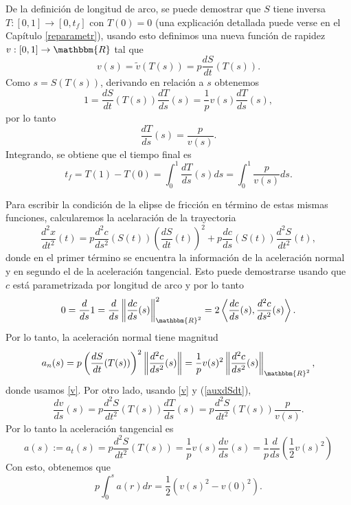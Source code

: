 \documentclass[a4paper,10pt]{book}
\newcommand{\R}{\mathbbm{R}}
\newcommand{\arr}{\rightarrow}
\begin{document}
De la definici\'on de longitud de arco, se puede demostrar que $S$ tiene inversa $T:[0,1]\arr [0,t_f]$ con $T(0)=0$ (una explicación detallada puede verse en el Capítulo \ref{reparametr}), usando esto
definimos una nueva funci\'on de rapidez $v:[0,1]\arr\R$ tal que
\begin{equation}\label{v}
v(s)=\tilde v(T(s))=p\frac{dS}{dt}(T(s)). 
\end{equation}
Como $s=S(T(s))$, derivando en relaci\'on a $s$ obtenemos 
\begin{equation}\label{auxdSdt}
1=\frac{dS}{dt}(T(s)) \frac{dT}{ds}(s)= \frac{1}{p} v(s)\frac{dT}{ds}(s), 
\end{equation}
por lo tanto
\[
 \frac{dT}{ds}(s)=\frac{p}{v(s)}.
\]
Integrando, se obtiene que el tiempo final es
\begin{equation}\label{tiempo}
t_f=T(1)-T(0)=\int_{0}^{1} \frac{dT}{ds}(s) ds= \int_{0}^{1} \frac{p}{v(s)}ds.    
\end{equation}


Para escribir la condici\'on de la elipse de fricción en t\'ermino de estas mismas funciones, calcularemos la acelaración de la trayectoria
\begin{equation}\label{aceleracion}
\frac{d^2 x}{dt^2}(t)= p\frac{d^2 c}{ds^2}(S(t)) \left(\frac{dS}{dt}(t)\right)^2 + p\frac{dc}{ds}(S(t))\frac{d^2 S}{dt^2}(t),
\end{equation}
donde en el primer t\'ermino se encuentra la informaci\'on de la aceleraci\'on normal y en segundo el de la aceleraci\'on tangencial. Esto puede demostrarse usando que $c$ est\'a parametrizada por longitud de arco y por lo tanto
\[
 0=\frac{d}{ds}1=\frac{d}{ds}\left\| \frac{dc}{ds}(s)\right\|_{\R^2}^2=2 \left\langle\frac{dc}{ds}(s) , \frac{d^2 c}{ds^2}(s)\right\rangle. 
\]
Por lo tanto, la aceleración normal tiene magnitud
\begin{equation}\label{acelnormal}
a_n(s)=p\left(\frac{dS}{dt}(T(s))\right)^2\left\| \frac{d^2 c}{ds^2}(s) \right\|=\frac{1}{p} v(s)^2\left\| \frac{d^2 c}{ds^2}(s) \right\|_{\R^2},
\end{equation}
donde usamos \eqref{v}. Por otro lado, usando \eqref{v} y (\ref{auxdSdt}),
\[
 \frac{dv}{ds}(s)=p\frac{d^2 S}{dt^2}(T(s))\frac{dT}{ds}(s)=p\frac{d^2 S}{dt^2}(T(s))\frac{p}{v(s)}.
\]
Por lo tanto la aceleración tangencial es
\[
 a(s):=a_t(s)=p\frac{d^2 S}{dt^2}(T(s))=\frac{1}{p} v(s)\frac{d v}{ds}(s)=\frac{1}{p}\frac{d}{ds}\left(\frac{1}{2}v(s)^2\right)
\]
Con esto, obtenemos que
\begin{equation}\label{rel}
p \int_0^s a(r)dr =\frac{1}{2}(v(s)^2-v(0)^2). 
\end{equation}
\end{document}
